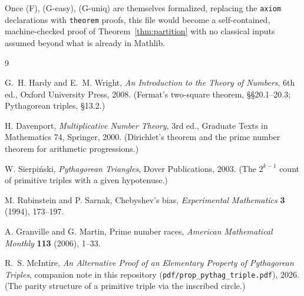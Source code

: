 \documentclass{article}
\theoremstyle{plain}
\theoremstyle{definition}
\theoremstyle{remark}
\begin{document}


Once (F), (G-easy), (G-uniq) are themselves formalized, replacing the
\verb|axiom| declarations with \verb|theorem| proofs, this file would
become a self-contained, machine-checked proof of Theorem~\ref{thm:partition}
with no classical inputs assumed beyond what is already in Mathlib.

\begin{thebibliography}{9}

 G.~H. Hardy and E.~M. Wright,
  {\em An Introduction to the Theory of Numbers}, 6th ed.,
  Oxford University Press, 2008.
  (Fermat's two-square theorem, \S\S 20.1--20.3; Pythagorean triples, \S 13.2.)

 H. Davenport,
  {\em Multiplicative Number Theory}, 3rd ed.,
  Graduate Texts in Mathematics 74, Springer, 2000.
  (Dirichlet's theorem and the prime number theorem for arithmetic progressions.)

 W. Sierpi\'nski,
  {\em Pythagorean Triangles}, Dover Publications, 2003.
  (The $2^{k-1}$ count of primitive triples with a given hypotenuse.)

 M. Rubinstein and P. Sarnak,
  Chebyshev's bias,
  {\em Experimental Mathematics} {\bf 3} (1994), 173--197.

 A. Granville and G. Martin,
  Prime number races,
  {\em American Mathematical Monthly} {\bf 113} (2006), 1--33.

 R.~S. McIntire,
  {\em An Alternative Proof of an Elementary Property of Pythagorean
  Triples}, companion note in this repository
  (\verb|pdf/prop_pythag_triple.pdf|), 2026.
  (The parity structure of a primitive triple via the inscribed circle.)

\end{thebibliography}
\end{document}
